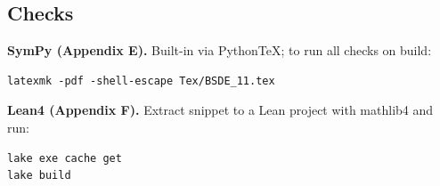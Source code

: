 \documentclass[11pt,letterpaper,oneside]{article}
\numberwithin{equation}{section}
\newcommand{\1}{\mathbf{1}}
\begin{document}
\subsection*{Checks}
\textbf{SymPy (Appendix E).} Built-in via PythonTeX; to run all checks on build:
\begin{tcolorbox}[sympycheckstyle]
\begin{Verbatim}[fontsize=\small]
latexmk -pdf -shell-escape Tex/BSDE_11.tex
\end{Verbatim}
\end{tcolorbox}

\textbf{Lean4 (Appendix F).} Extract snippet to a Lean project with mathlib4 and run:
\begin{tcolorbox}[leanproofstyle]
\begin{Verbatim}[fontsize=\small]
lake exe cache get
lake build
\end{Verbatim}
\end{tcolorbox}

\end{document}
